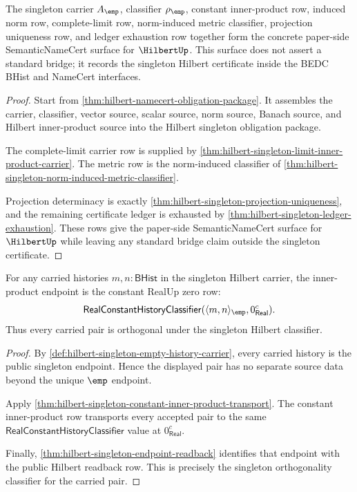\begin{theorem}
\label{thm:hilbert-singleton-semantic-namecert-surface}
The singleton carrier $A_{\emp}$, classifier $\rho_{\emp}$, constant
inner-product row, induced norm row, complete-limit row, norm-induced metric
classifier, projection uniqueness row, and ledger exhaustion row together form
the concrete paper-side SemanticNameCert surface for $\HilbertUp$. This surface
does not assert a standard bridge; it records the singleton Hilbert certificate
inside the BEDC BHist and NameCert interfaces.
\end{theorem}
\begin{proof}
Start from \autoref{thm:hilbert-namecert-obligation-package}. It assembles the
carrier, classifier, vector source, scalar source, norm source, Banach source,
and Hilbert inner-product source into the Hilbert singleton obligation package.

The complete-limit carrier row is supplied by
\autoref{thm:hilbert-singleton-limit-inner-product-carrier}. The metric row is
the norm-induced classifier of
\autoref{thm:hilbert-singleton-norm-induced-metric-classifier}.

Projection determinacy is exactly
\autoref{thm:hilbert-singleton-projection-uniqueness}, and the remaining
certificate ledger is exhausted by
\autoref{thm:hilbert-singleton-ledger-exhaustion}. These rows give the
paper-side SemanticNameCert surface for $\HilbertUp$ while leaving any
standard bridge claim outside the singleton certificate.
\end{proof}

\begin{theorem}
\label{thm:hilbert-singleton-universal-orthogonality}
For any carried histories $m,n:\mathsf{BHist}$ in the singleton Hilbert
carrier, the inner-product endpoint is the constant RealUp zero row:
$$
\mathsf{RealConstantHistoryClassifier}
  (\langle m,n\rangle_{\emp},0_{\mathsf{Real}}^{c}).
$$
Thus every carried pair is orthogonal under the singleton Hilbert classifier.
\end{theorem}
\begin{proof}
By \autoref{def:hilbert-singleton-empty-history-carrier}, every carried
history is the public singleton endpoint. Hence the displayed pair has no
separate source data beyond the unique $\emp$ endpoint.

Apply
\autoref{thm:hilbert-singleton-constant-inner-product-transport}. The
constant inner-product row transports every accepted pair to the same
$\mathsf{RealConstantHistoryClassifier}$ value at $0_{\mathsf{Real}}^{c}$.

Finally,
\autoref{thm:hilbert-singleton-endpoint-readback} identifies that endpoint
with the public Hilbert readback row. This is precisely the singleton
orthogonality classifier for the carried pair.
\end{proof}

